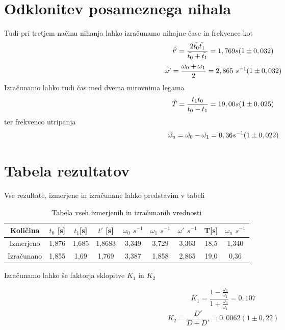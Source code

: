 \documentclass[a4paper]{report}
\begin{document}
\section*{Odklonitev posameznega nihala}
Tudi pri tretjem načinu nihanja lahko izračunamo nihajne čase in frekvence kot
$$\Tilde{t'}=\frac{2\Tilde{t_0}\Tilde{t_1}}{\Tilde{t_0}+\Tilde{t_1}} = 1,769 s (1\pm 0,032)
$$
$$\Tilde{\omega'}= \frac{\Tilde{\omega_0}+\Tilde{\omega_1}  }{2}= 2,865 \ s^{-1} (1\pm 0,032)
$$
Izračunamo lahko tudi čas med dvema mirovnima legama
$$\Tilde{T} = \frac{t_1t_0}{t_0-t_1} = 19,00 s (1\pm 0,025)
$$
ter frekvenco utripanja 
$$\Tilde{\omega_u}= \Tilde{\omega_0} - \Tilde{\omega_1} = 0,36 s^{-1} (1\pm 0,022)
$$
\section*{Tabela rezultatov}
Vse rezultate, izmerjene in izračunane lahko predstavim v tabeli
\begin{table}[H]
    \centering
    \begin{tabular}{c|c|c|c|c|c|c|c|c}
         Količina& $t_0$ [s]& $t_1$[s]&$t'$ [s]& $\omega_0$ $s^{-1}$ & $\omega_1$ $s^{-1}$&$\omega'$ $s^{-1}$& T[s]&$\omega_u$ $s^{-1}$\\
         \hline
         Izmerjeno&1,876&1,685&1,8683&3,349&3,729&3,363&18,5&1,340\\
         Izračunano&1,855&1,69&1,769&3,387&1,858&2,865&19,0&0,36\\
    \end{tabular}
    \caption{Tabela vseh izmerjenih in izračunanih vrednosti}
    \label{tab:my_label}
\end{table}
Izračunamo lahko še faktorja sklopitve $K_1$ in $K_2$ 

$$ K_1 = \frac{1-\frac{\omega_0}{\omega_1}}{1+\frac{\omega_0}{\omega_1}} = 0,107
$$
$$K_2 = \frac{D'}{D+D'} = 0,0062 (1\pm 0,22)
$$
\end{document}
